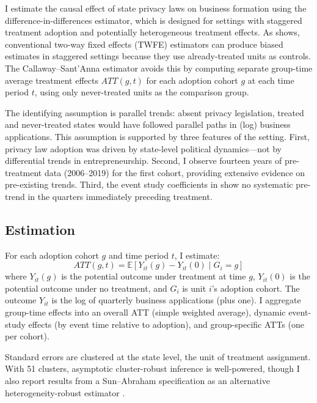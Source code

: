 \documentclass[12pt]{article}
\newcommand{\E}{\mathbb{E}}
\begin{document}
I estimate the causal effect of state privacy laws on business formation using the \citet{callaway2021} difference-in-differences estimator, which is designed for settings with staggered treatment adoption and potentially heterogeneous treatment effects. As \citet{goodmanbacon2021} shows, conventional two-way fixed effects (TWFE) estimators can produce biased estimates in staggered settings because they use already-treated units as controls. The Callaway--Sant'Anna estimator avoids this by computing separate group-time average treatment effects $ATT(g,t)$ for each adoption cohort $g$ at each time period $t$, using only never-treated units as the comparison group.

The identifying assumption is parallel trends: absent privacy legislation, treated and never-treated states would have followed parallel paths in (log) business applications. This assumption is supported by three features of the setting. First, privacy law adoption was driven by state-level political dynamics---not by differential trends in entrepreneurship. Second, I observe fourteen years of pre-treatment data (2006--2019) for the first cohort, providing extensive evidence on pre-existing trends. Third, the event study coefficients in  show no systematic pre-trend in the quarters immediately preceding treatment.

\subsection{Estimation}

For each adoption cohort $g$ and time period $t$, I estimate:
\begin{equation}
ATT(g,t) = \E[Y_{it}(g) - Y_{it}(0) \mid G_i = g]
\end{equation}
where $Y_{it}(g)$ is the potential outcome under treatment at time $g$, $Y_{it}(0)$ is the potential outcome under no treatment, and $G_i$ is unit $i$'s adoption cohort. The outcome $Y_{it}$ is the log of quarterly business applications (plus one). I aggregate group-time effects into an overall ATT (simple weighted average), dynamic event-study effects (by event time relative to adoption), and group-specific ATTs (one per cohort).

Standard errors are clustered at the state level, the unit of treatment assignment. With 51 clusters, asymptotic cluster-robust inference is well-powered, though I also report results from a Sun--Abraham specification as an alternative heterogeneity-robust estimator \citep{sun2021}.
\end{document}
